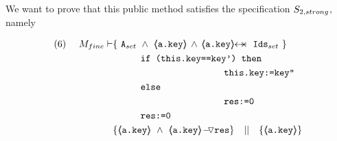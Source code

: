We want to prove that this public method satisfies the specification  $S_{2,strong}$, namely

\begin{lemma}
\label{l:set:sat}
\label{l:satisfies:Mfine:pec2}
 
\begin{align*}
\text{(6)}  \ \ \ \ M_{fine} \vdash 
		&	\{  \ \Alocalsset\ \wedge\  {\inside{\prg{a.key}}} \, \wedge \, \protectedFrom {\prg{a.key}} {\Idsset}  \  \} \\
		& \SPT   \prg{if (this.key==key') then }\\
		& \SPT \SPT   \SPT\SPT  \prg{this.key:=key''} \\
	        & \SPT   \prg{else }\\
		& \SPT\SPT   \SPT\SPT  \prg{res:=0} \\
		& \SPT \prg{res:=0} \\
& \{ {\inside{\prg{a.key}}}\ \wedge\ {\PushASLong {\prg{res}} {\inside{\prg{a.key}}}}  \} \ \ \  || \ \ \ 
	   \{ {\inside{\prg{a.key}}} \}
\end{align*}

\end{lemma}

